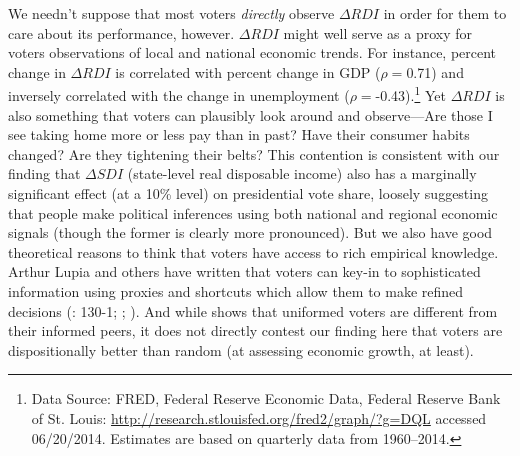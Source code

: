\documentclass[11pt]{article}
\begin{document}
We needn't suppose that most voters \emph{directly} observe $\Delta
RDI$ in order for them to care about its performance, however. $\Delta RDI$ might well serve as
a proxy for voters observations of local and national economic
trends. For instance, percent change in $\Delta
RDI$ is correlated with percent change in GDP
($\rho=$0.71) and inversely correlated with the change in  unemployment
($\rho=$-0.43).\footnote{Data Source: FRED, Federal Reserve Economic
  Data, Federal Reserve Bank of St. Louis:
  \url{http://research.stlouisfed.org/fred2/graph/?g=DQL} accessed
  06/20/2014. Estimates are based on quarterly data from 1960--2014.}
 Yet $\Delta RDI$ is also something that voters can plausibly look around and
observe---Are those I see taking home more or less pay than in past?
Have their consumer habits changed? Are they tightening their belts? This contention is consistent with our finding that $\Delta SDI$ (state-level real disposable income) also has a marginally significant effect (at a 10\% level) on presidential vote share, loosely suggesting that people make political inferences using both national and regional economic signals (though the former is clearly more pronounced).
But we also have good theoretical reasons to think that voters
have access to rich empirical knowledge. Arthur Lupia and others have written
that voters can key-in to sophisticated information using proxies
and shortcuts which allow them to make refined decisions (\citet{Kinder1981}: 130-1; \citet{Lupia2000};
\citet{Lupia2006}). And while \cite{bartels1996uninformed} shows that uniformed voters are different from their informed peers, it does not directly contest our finding here that voters are dispositionally better than random (at assessing economic growth, at least).
\end{document}
